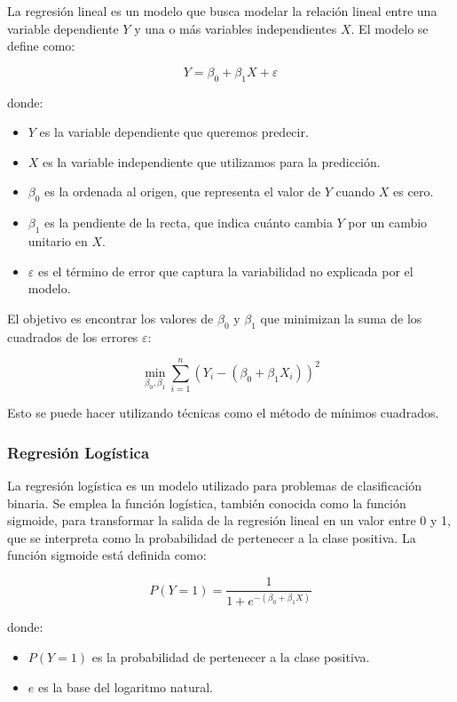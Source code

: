 \documentclass[12pt]{article}
\begin{document}
La regresión lineal es un modelo que busca modelar la relación lineal entre una variable dependiente \(Y\) y una o más variables independientes \(X\). El modelo se define como:

\[
Y = \beta_0 + \beta_1 X + \varepsilon
\]

donde:
\begin{itemize}
    \item \(Y\) es la variable dependiente que queremos predecir.
    \item \(X\) es la variable independiente que utilizamos para la predicción.
    \item \(\beta_0\) es la ordenada al origen, que representa el valor de \(Y\) cuando \(X\) es cero.
    \item \(\beta_1\) es la pendiente de la recta, que indica cuánto cambia \(Y\) por un cambio unitario en \(X\).
    \item \(\varepsilon\) es el término de error que captura la variabilidad no explicada por el modelo.
\end{itemize}

El objetivo es encontrar los valores de \(\beta_0\) y \(\beta_1\) que minimizan la suma de los cuadrados de los errores \(\varepsilon\):

\[
\min_{\beta_0, \beta_1} \sum_{i=1}^{n} (Y_i - (\beta_0 + \beta_1 X_i))^2
\]

Esto se puede hacer utilizando técnicas como el método de mínimos cuadrados.

\subsubsection{Regresión Logística}

La regresión logística es un modelo utilizado para problemas de clasificación binaria. Se emplea la función logística, también conocida como la función sigmoide, para transformar la salida de la regresión lineal en un valor entre 0 y 1, que se interpreta como la probabilidad de pertenecer a la clase positiva. La función sigmoide está definida como:

\[
P(Y=1) = \frac{1}{1 + e^{-(\beta_0 + \beta_1 X)}}
\]

donde:
\begin{itemize}
    \item \(P(Y=1)\) es la probabilidad de pertenecer a la clase positiva.
    \item \(e\) es la base del logaritmo natural.
\end{itemize}
\end{document}
